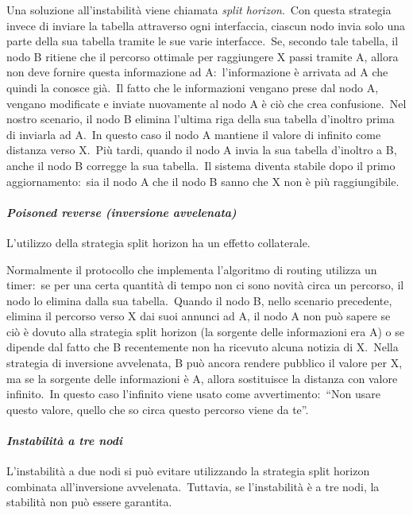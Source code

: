 Una soluzione all'instabilità viene chiamata \emph{split horizon}.\
Con questa strategia invece di inviare la tabella attraverso ogni interfaccia, ciascun nodo invia solo una parte della sua tabella tramite le sue varie interfacce.\
Se, secondo tale tabella, il nodo B ritiene che il percorso ottimale per raggiungere X passi tramite A, allora non deve fornire questa informazione ad A:\ l'informazione è arrivata ad A che quindi la conosce già.\
Il fatto che le informazioni vengano prese dal nodo A, vengano modificate e inviate nuovamente al nodo A è ciò che crea confusione.\
Nel nostro scenario, il nodo B elimina l'ultima riga della sua tabella d'inoltro prima di inviarla ad A.\
In questo caso il nodo A mantiene il valore di infinito come distanza verso X.\
Più tardi, quando il nodo A invia la sua tabella d'inoltro a B, anche il nodo B corregge la sua tabella.\
Il sistema diventa stabile dopo il primo aggiornamento:\ sia il nodo A che il nodo B sanno che X non è più raggiungibile.

\paragraph{\emph{Poisoned reverse (inversione avvelenata)}} L'utilizzo della strategia split horizon ha un effetto collaterale.\

Normalmente il protocollo che implementa l'algoritmo di routing utilizza un timer:\ se per una certa quantità di tempo non ci sono novità circa un percorso, il nodo lo elimina dalla sua tabella.\
Quando il nodo B, nello scenario precedente, elimina il percorso verso X dai suoi annunci ad A, il nodo A non può sapere se ciò è dovuto alla strategia split horizon (la sorgente delle informazioni era A) o se dipende dal fatto che B recentemente non ha ricevuto alcuna notizia di X.\
Nella strategia di inversione avvelenata, B può ancora rendere pubblico il valore per X, ma se la sorgente delle informazioni è A, allora sostituisce la distanza con valore infinito.\
In questo caso l'infinito viene usato come avvertimento:\ ``Non usare questo valore, quello che so circa questo percorso viene da te''.

\paragraph{\emph{Instabilità a tre nodi}}

L'instabilità a due nodi si può evitare utilizzando la strategia split horizon combinata all'inversione avvelenata.\
Tuttavia, se l'instabilità è a tre nodi, la stabilità non può essere garantita.

